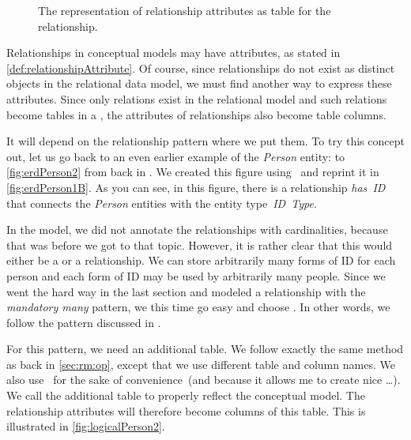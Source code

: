%
\label{sec:conceptToLogic:relationshipAttributes}%
%
\begin{figure}%
\centering%
%
%
%
\floatRowSep%
%
%
%
\caption{The representation of relationship attributes as table for the relationship.}%
\label{fig:logicalPerson2X}%
\end{figure}%
%
Relationships in conceptual models may have attributes, as stated in \cref{def:relationshipAttribute}.
Of course, since relationships do not exist as distinct objects in the relational data model, we must find another way to express these attributes.
Since only relations exist in the relational model and such relations become tables in a \db, the attributes of relationships also become table columns.

It will depend on the relationship pattern where we put them.
To try this concept out, let us go back to an even earlier example of the \emph{Person} entity:
to \cref{fig:erdPerson2} from back in .
We created this figure using \yEd\ and reprint it in \cref{fig:erdPerson1B}.
As you can see, in this figure, there is a relationship \emph{has~ID} that connects the \emph{Person} entities with the entity type~\emph{ID~Type}.

In the model, we did not annotate the relationships with cardinalities, because that was before we got to that topic.
However, it is rather clear that this would either be a  or a  relationship.
We can store arbitrarily many forms of ID for each person and each form of ID may be used by arbitrarily many people.
Since we went the hard way in the last section and modeled a relationship with the \emph{mandatory many} pattern, we this time go easy and choose .
In other words, we follow the pattern  discussed in .

For this pattern, we need an additional table.
We follow exactly the same method as back in \cref{sec:rm:op}, except that we use different table and column names.
We also use \pgmodeler\ for the sake of convenience~(and because it allows me to create nice \dots).
We call the additional table  to properly reflect the conceptual model.
The relationship attributes will therefore become columns of this table.
This is illustrated in \cref{fig:logicalPerson2}.

